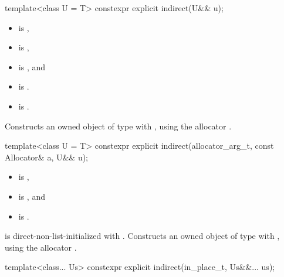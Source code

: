 %
\begin{itemdecl}
template<class U = T>
  constexpr explicit indirect(U&& u);
\end{itemdecl}

\begin{itemdescr}
\pnum
\constraints
\begin{itemize}
\item
{} is ,
\item
{} is ,
\item
\textcolor{coered}{ is }, and
\item
{} is .
\end{itemize}

\textcolor{coedarkgreen}{
\pnum
\mandates
\begin{itemize}
\item
{} is .
\end{itemize}}

\pnum
\effects
Constructs an owned object of type  with ,
using the allocator .
\end{itemdescr}

%
\begin{itemdecl}
template<class U = T>
  constexpr explicit indirect(allocator_arg_t, const Allocator& a, U&& u);
\end{itemdecl}

\begin{itemdescr}
\pnum
\constraints
\begin{itemize}
\item
{} is ,
\item
{} is , and
\item
{} is .
\end{itemize}

\pnum
\effects
{} is direct-non-list-initialized with .
Constructs an owned object of type  with
,
using the allocator .
\end{itemdescr}

%
\begin{itemdecl}
template<class... Us>
  constexpr explicit indirect(in_place_t, Us&&... us);
\end{itemdecl}

